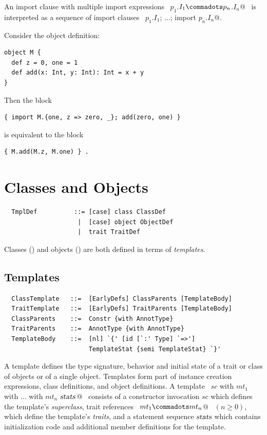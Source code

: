 An import clause with multiple import expressions
~\lstinline@import $p_1$.$I_1 \commadots p_n$.$I_n$@~ is interpreted as a
sequence of import clauses 
~\lstinline@import $p_1$.$I_1$; $\ldots$; import $p_n$.$I_n$@.

\example Consider the object definition:
\begin{lstlisting}
object M { 
  def z = 0, one = 1  
  def add(x: Int, y: Int): Int = x + y 
}
\end{lstlisting}
Then the block
\begin{lstlisting}
{ import M.{one, z => zero, _}; add(zero, one) }
\end{lstlisting}
is equivalent to the block 
\begin{lstlisting}
{ M.add(M.z, M.one) } .
\end{lstlisting}

\chapter{Classes and Objects}
\label{sec:globaldefs}

\syntax\begin{lstlisting}
  TmplDef          ::= [case] class ClassDef
                    |  [case] object ObjectDef
                    |  trait TraitDef
\end{lstlisting}

Classes () and objects
() are both defined in terms of {\em templates}.

\section{Templates}
\label{sec:templates}

\syntax\begin{lstlisting}
  ClassTemplate   ::=  [EarlyDefs] ClassParents [TemplateBody]
  TraitTemplate   ::=  [EarlyDefs] TraitParents [TemplateBody]
  ClassParents    ::=  Constr {with AnnotType}
  TraitParents    ::=  AnnotType {with AnnotType}
  TemplateBody    ::=  [nl] `{' [id [`:' Type] `=>'] 
                       TemplateStat {semi TemplateStat} `}'
\end{lstlisting}

A template defines the type signature, behavior and initial state of a
trait or class of objects or of a single object. Templates form part of
instance creation expressions, class definitions, and object
definitions.  A template 
~\lstinline@$sc$ with $mt_1$ with $\ldots$ with $mt_n$ {$\mbox{\sl stats}\,$}@~ 
consists of a constructor invocation $sc$
which defines the template's {\em superclass}, trait references
~\lstinline@$mt_1 \commadots mt_n$@~ $(n \geq 0)$, which define the
template's {\em traits}, and a statement sequence $\mbox{\sl stats}$ which
contains initialization code and additional member definitions for the
template.

